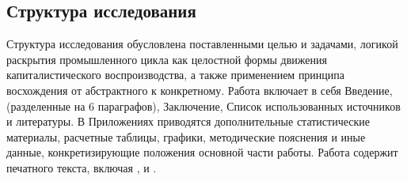 \subsection*{Структура исследования}
Структура исследования обусловлена поставленными целью и задачами, логикой раскрытия промышленного цикла как целостной формы движения капиталистического воспроизводства, а также применением принципа восхождения от абстрактного к конкретному. Работа включает в себя Введение,  (разделенные на 6 параграфов), Заключение, Список использованных источников и литературы. В Приложениях приводятся дополнительные статистические материалы, расчетные таблицы, графики, методические пояснения и иные данные, конкретизирующие положения основной части работы. Работа содержит  печатного текста, включая ,  и .